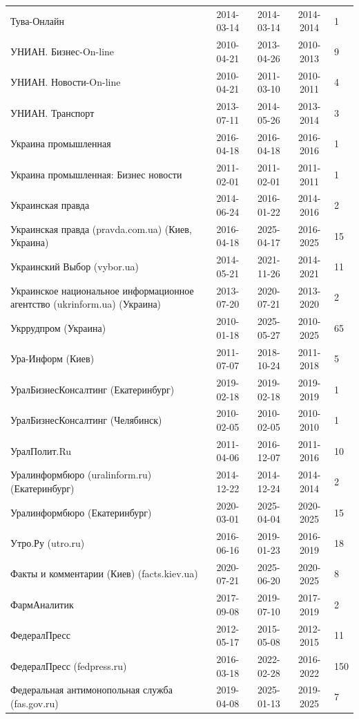 \begin{longtable}{p{6cm}cccp{2cm}}
Тува-Онлайн & 2014-03-14 & 2014-03-14 & 2014-2014 & 1\\
УНИАН. Бизнес-On-line & 2010-04-21 & 2013-04-26 & 2010-2013 & 9\\
УНИАН. Новости-On-line & 2010-04-21 & 2011-03-10 & 2010-2011 & 4\\
УНИАН. Транспорт & 2013-07-11 & 2014-05-26 & 2013-2014 & 3\\
Украина промышленная & 2016-04-18 & 2016-04-18 & 2016-2016 & 1\\
Украина промышленная: Бизнес новости & 2011-02-01 & 2011-02-01 & 2011-2011 & 1\\
Украинская правда & 2014-06-24 & 2016-01-22 & 2014-2016 & 2\\
Украинская правда (pravda.com.ua) (Киев, Украина) & 2016-04-18 & 2025-04-17 & 2016-2025 & 15\\
Украинский Выбор (vybor.ua) & 2014-05-21 & 2021-11-26 & 2014-2021 & 11\\
Украинское национальное информационное агентство (ukrinform.ua) (Украина) & 2013-07-20 & 2020-07-21 & 2013-2020 & 2\\
Укррудпром (Украина) & 2010-01-18 & 2025-05-27 & 2010-2025 & 65\\
Ура-Информ (Киев) & 2011-07-07 & 2018-10-24 & 2011-2018 & 5\\
УралБизнесКонсалтинг (Екатеринбург) & 2019-02-18 & 2019-02-18 & 2019-2019 & 1\\
УралБизнесКонсалтинг (Челябинск) & 2010-02-05 & 2010-02-05 & 2010-2010 & 1\\
УралПолит.Ru & 2011-04-06 & 2016-12-07 & 2011-2016 & 10\\
Уралинформбюро (uralinform.ru) (Екатеринбург) & 2014-12-22 & 2014-12-24 & 2014-2014 & 2\\
Уралинформбюро (Екатеринбург) & 2020-03-01 & 2025-04-04 & 2020-2025 & 15\\
Утро.Ру (utro.ru) & 2016-06-16 & 2019-01-23 & 2016-2019 & 18\\
Факты и комментарии (Киев) (facts.kiev.ua) & 2020-07-21 & 2025-06-20 & 2020-2025 & 8\\
ФармАналитик & 2017-09-08 & 2019-07-10 & 2017-2019 & 2\\
ФедералПресс & 2012-05-17 & 2015-05-08 & 2012-2015 & 11\\
ФедералПресс (fedpress.ru) & 2016-03-18 & 2022-02-28 & 2016-2022 & 150\\
Федеральная антимонопольная служба (fas.gov.ru) & 2019-04-08 & 2025-01-13 & 2019-2025 & 7\\

\end{longtable}

